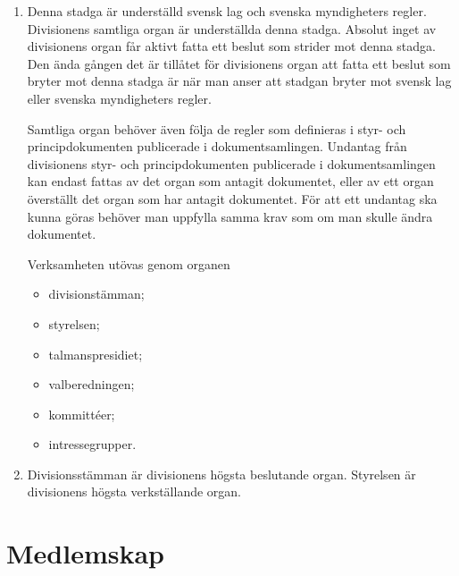 \documentclass{dvd}
\begin{document}
	\begin{enumerate}[label=\arabic* §, ref=\arabic*]
		\item Denna stadga är underställd svensk lag och svenska myndigheters regler.
		Divisionens samtliga organ är underställda denna stadga.
		Absolut inget av divisionens organ får aktivt fatta ett beslut som strider mot denna stadga.
		Den ända gången det är tillåtet för divisionens organ att fatta ett beslut som bryter mot denna stadga är när man anser att stadgan bryter mot svensk lag eller svenska myndigheters regler.

		Samtliga organ behöver även följa de regler som definieras i styr- och principdokumenten publicerade i dokumentsamlingen.
		Undantag från divisionens styr- och principdokumenten publicerade i dokumentsamlingen kan endast fattas av det organ som antagit dokumentet, eller av ett organ överställt det organ som har antagit dokumentet.
		För att ett undantag ska kunna göras behöver man uppfylla samma krav som om man skulle ändra dokumentet.

		Verksamheten utövas genom organen

		\begin{itemize}
			\item divisionstämman;
			\item styrelsen;
			\item talmanspresidiet;
			\item valberedningen;
			\item kommittéer;
			\item intressegrupper.
		\end{itemize}

		\item Divisionsstämman är divisionens högsta beslutande organ.
		Styrelsen är divisionens högsta verkställande organ.
	\end{enumerate}

	\section{Medlemskap}
\end{document}
